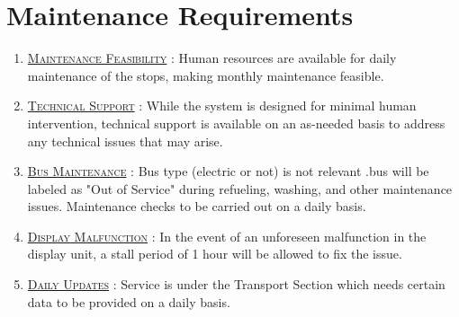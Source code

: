 \section{Maintenance Requirements}

\begin{enumerate}
    \item \underline{\textsc{Maintenance Feasibility}} : Human resources are available for daily maintenance of the stops, making monthly maintenance feasible.

    \item {}\underline{\textsc{Technical Support}} : While the system is designed for minimal human intervention, technical support is available on an as-needed basis to address any technical issues that may arise.

    \item \underline{\textsc{Bus Maintenance}} : Bus type (electric or not) is not relevant .bus will be labeled as "Out of Service" during refueling, washing, and other maintenance issues. Maintenance checks to be carried out on a daily basis.

    \item {}\underline{\textsc{Display Malfunction}} : In the event of an unforeseen malfunction in the display unit, a \gls{stall period} of 1 hour will be allowed to fix the issue.

    \item \underline{\textsc{Daily Updates}} : Service is under the Transport Section which needs certain data to be provided on a daily basis.
\end{enumerate}